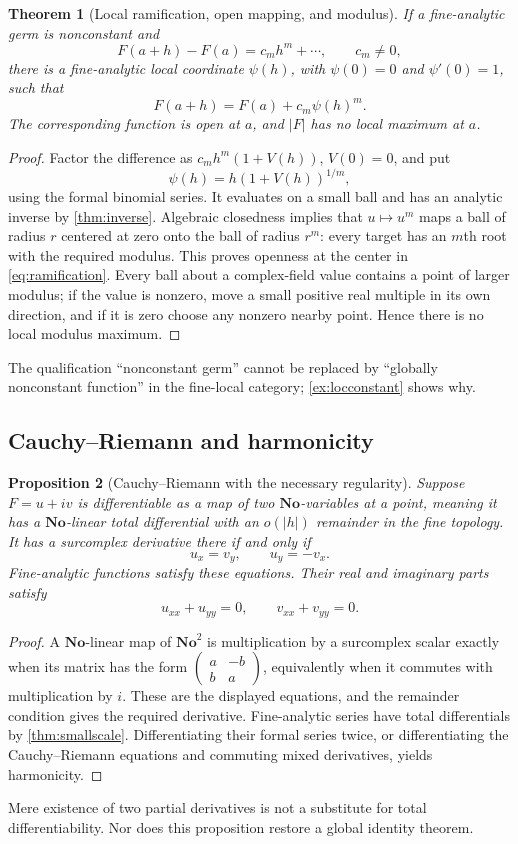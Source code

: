 \documentclass[11pt,letterpaper]{article}
\newtheorem{theorem}{Theorem}[section]
\newtheorem{proposition}[theorem]{Proposition}
\theoremstyle{definition}
\theoremstyle{remark}
\newcommand{\No}{\mathbf{No}}
\numberwithin{equation}{section}
\begin{document}
\begin{theorem}[Local ramification, open mapping, and modulus]\label{thm:ramification}
If a fine-analytic germ is nonconstant and
\[
 F(a+h)-F(a)=c_mh^m+\cdots,\qquad c_m\ne0,
\]
there is a fine-analytic local coordinate $\psi(h)$, with $\psi(0)=0$ and $\psi'(0)=1$, such that
\begin{equation}\label{eq:ramification}
 F(a+h)=F(a)+c_m\psi(h)^m.
\end{equation}
The corresponding function is open at $a$, and $|F|$ has no local maximum at $a$.
\end{theorem}
\begin{proof}
Factor the difference as $c_mh^m(1+V(h))$, $V(0)=0$, and put
\[
 \psi(h)=h(1+V(h))^{1/m},
\]
using the formal binomial series. It evaluates on a small ball and has an analytic inverse by \cref{thm:inverse}. Algebraic closedness implies that $u\mapsto u^m$ maps a ball of radius $r$ centered at zero onto the ball of radius $r^m$: every target has an $m$th root with the required modulus. This proves openness at the center in \eqref{eq:ramification}. Every ball about a complex-field value contains a point of larger modulus; if the value is nonzero, move a small positive real multiple in its own direction, and if it is zero choose any nonzero nearby point. Hence there is no local modulus maximum.
\end{proof}
The qualification ``nonconstant germ'' cannot be replaced by ``globally nonconstant function'' in the fine-local category; \cref{ex:locconstant} shows why.

\subsection{Cauchy--Riemann and harmonicity}
\begin{proposition}[Cauchy--Riemann with the necessary regularity]\label{prop:CR}
Suppose $F=u+iv$ is differentiable as a map of two $\No$-variables at a point, meaning it has a $\No$-linear total differential with an $o(|h|)$ remainder in the fine topology. It has a surcomplex derivative there if and only if
\[
 u_x=v_y,\qquad u_y=-v_x.
\]
Fine-analytic functions satisfy these equations. Their real and imaginary parts satisfy
\[
 u_{xx}+u_{yy}=0,\qquad v_{xx}+v_{yy}=0.
\]
\end{proposition}
\begin{proof}
A $\No$-linear map of $\No^2$ is multiplication by a surcomplex scalar exactly when its matrix has the form
$\left(\begin{smallmatrix}a&-b\\ b&a\end{smallmatrix}\right)$, equivalently when it commutes with multiplication by $i$. These are the displayed equations, and the remainder condition gives the required derivative. Fine-analytic series have total differentials by \cref{thm:smallscale}. Differentiating their formal series twice, or differentiating the Cauchy--Riemann equations and commuting mixed derivatives, yields harmonicity.
\end{proof}
Mere existence of two partial derivatives is not a substitute for total differentiability. Nor does this proposition restore a global identity theorem.
\end{document}
